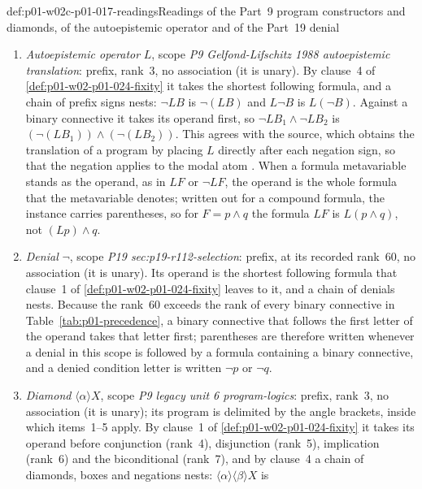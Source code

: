 \begin{hbconvention}{def:p01-w02c-p01-017-readings}{Readings of the Part~9 program constructors and diamonds, of the autoepistemic operator and of the Part~19 denial}
\begin{enumerate}
  constructor; a formula occurs inside a program only as the operand of a
  test, which item~1 delimits.  The scale is the one that item~20 of
  \cref{def:p01-w02b-p01-012-p8-readings} sets up for the programs of
  \cref{def:p08-bvb501-pdl}, so the two dynamic logics of Parts~8 and~9
  read every program string alike.
\item \emph{Autoepistemic operator} \(L\), scope \emph{P9
  Gelfond-Lifschitz 1988 autoepistemic translation}: prefix, rank~3, no
  association (it is unary).  By clause~4 of
  \cref{def:p01-w02-p01-024-fixity} it takes the shortest following
  formula, and a chain of prefix signs nests: \(\neg LB\) is
  \(\neg(LB)\) and \(L\neg B\) is \(L(\neg B)\).  Against a binary
  connective it takes its operand first, so \(\neg LB_1\land\neg LB_2\) is
  \((\neg(LB_1))\land(\neg(LB_2))\).  This agrees with the source, which
  obtains the translation of a program by placing \(L\) directly after
  each negation sign, so that the negation applies to the modal atom
  \cite[p.~8]{GelfondLifschitz1988}.  When a formula metavariable stands
  as the operand, as in \(LF\) or \(\neg LF\), the operand is the whole
  formula that the metavariable denotes; written out for a compound
  formula, the instance carries parentheses, so for \(F=p\land q\) the
  formula \(LF\) is \(L(p\land q)\), not \((Lp)\land q\).
\item \emph{Denial} \(\neg\), scope \emph{P19 sec:p19-r112-selection}:
  prefix, at its recorded rank~60, no association (it is unary).  Its
  operand is the shortest following formula that clause~1 of
  \cref{def:p01-w02-p01-024-fixity} leaves to it, and a chain of denials
  nests.  Because the rank~60 exceeds the rank of every binary connective
  in Table~\ref{tab:p01-precedence}, a binary connective that follows the
  first letter of the operand takes that letter first; parentheses are
  therefore written whenever a denial in this scope is followed by a
  formula containing a binary connective, and a denied condition letter
  is written \(\neg p\) or \(\neg q\).
\item \emph{Diamond} \(\langle\alpha\rangle X\), scope \emph{P9 legacy
  unit 6 program-logics}: prefix, rank~3, no association (it is unary);
  its program is delimited by the angle brackets, inside which items~1--5
  apply.  By clause~1 of \cref{def:p01-w02-p01-024-fixity} it takes its
  operand before conjunction (rank~4), disjunction (rank~5), implication
  (rank~6) and the biconditional (rank~7), and by clause~4 a chain of
  diamonds, boxes and negations nests:
  \(\langle\alpha\rangle\langle\beta\rangle X\) is

\end{enumerate}
\end{hbconvention}
